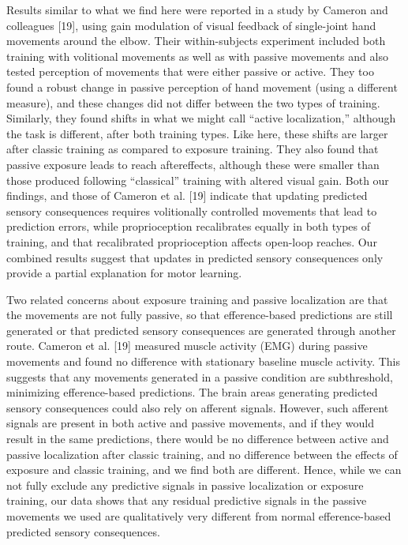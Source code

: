 \documentclass[10pt,letterpaper]{article}
\begin{document}
Results similar to what we find here were reported in a study by Cameron
and colleagues {[}19{]}, using gain modulation of visual feedback of
single-joint hand movements around the elbow. Their within-subjects
experiment included both training with volitional movements as well as
with passive movements and also tested perception of movements that were
either passive or active. They too found a robust change in passive
perception of hand movement (using a different measure), and these
changes did not differ between the two types of training. Similarly,
they found shifts in what we might call ``active localization,''
although the task is different, after both training types. Like here,
these shifts are larger after classic training as compared to exposure
training. They also found that passive exposure leads to reach
aftereffects, although these were smaller than those produced following
``classical'' training with altered visual gain. Both our findings, and
those of Cameron et al. {[}19{]} indicate that updating predicted
sensory consequences requires volitionally controlled movements that
lead to prediction errors, while proprioception recalibrates equally in
both types of training, and that recalibrated proprioception affects
open-loop reaches. Our combined results suggest that updates in
predicted sensory consequences only provide a partial explanation for
motor learning.

Two related concerns about exposure training and passive localization
are that the movements are not fully passive, so that efference-based
predictions are still generated or that predicted sensory consequences
are generated through another route. Cameron et al. {[}19{]} measured
muscle activity (EMG) during passive movements and found no difference
with stationary baseline muscle activity. This suggests that any
movements generated in a passive condition are subthreshold, minimizing
efference-based predictions. The brain areas generating predicted
sensory consequences could also rely on afferent signals. However, such
afferent signals are present in both active and passive movements, and
if they would result in the same predictions, there would be no
difference between active and passive localization after classic
training, and no difference between the effects of exposure and classic
training, and we find both are different. Hence, while we can not fully
exclude any predictive signals in passive localization or exposure
training, our data shows that any residual predictive signals in the
passive movements we used are qualitatively very different from normal
efference-based predicted sensory consequences.
\end{document}
